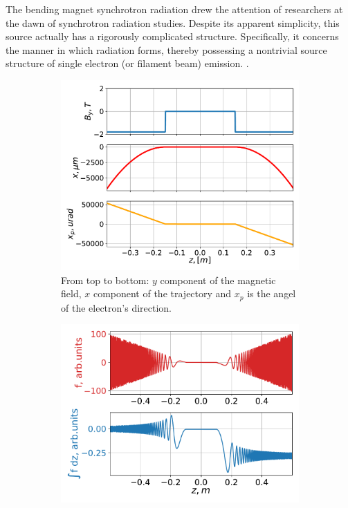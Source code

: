     The bending magnet synchrotron radiation drew the attention of researchers at the dawn of synchrotron radiation studies. Despite its apparent simplicity, this source actually has a rigorously complicated structure. Specifically, it concerns the manner in which radiation forms, thereby possessing a nontrivial source structure of single electron (or filament beam) emission. . 
    \begin{figure}[h!]
        \centering
        \begin{subfigure}[c]{0.5\linewidth}
            \centering
            \includegraphics[width=\linewidth]{content/images/5_THz_Source/bend_traj.pdf}
            \caption{From top to bottom: $y$ component of the magnetic field, $x$ component of the trajectory and $x_p$ is the angel of the electron's direction.} %
            \label{Fig:bending_traj}
        \end{subfigure}%
        \begin{subfigure}[c]{0.5\linewidth}
            \centering
            \includegraphics[width=\linewidth]{content/images/5_THz_Source/bend_integral.pdf}

\end{subfigure}
\end{figure}
